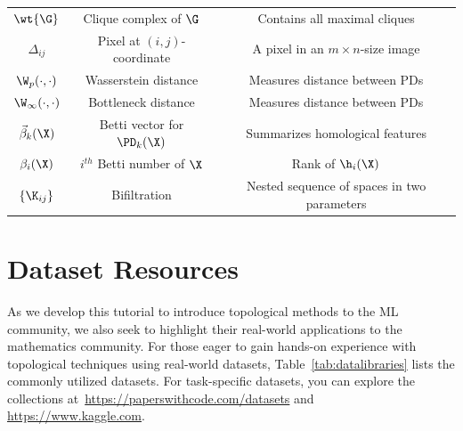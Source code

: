 \begin{table}[h!]
\begin{tabular}{ccc}
$\wt{\G}$ & Clique complex of $\G$ & Contains all maximal cliques \\
$\Delta_{ij}$ & Pixel at $(i,j)$-coordinate & A pixel in an $m\times n$-size image \\
$\W_p(\cdot, \cdot)$ & Wasserstein distance & Measures distance between PDs  \\
$\W_\infty(\cdot, \cdot)$ & Bottleneck distance & Measures distance between PDs \\
$\vec{\beta}_k(\X)$ & Betti vector for $\PD_k(\X)$ & Summarizes homological features \\
$\beta_i(\X)$ &  $i^{th}$ Betti number of $\X$ & Rank of $\h_i(\X)$ \\
$\{\K_{ij}\}$ & Bifiltration & Nested sequence of spaces in two parameters\\
\bottomrule
\end{tabular}
\end{table}


\section{Dataset Resources}

As we develop this tutorial to introduce topological methods to the ML community, we also seek to highlight their real-world applications to the mathematics community. For those eager to gain hands-on experience with topological techniques using real-world datasets, Table~\ref{tab:datalibraries} lists the commonly utilized datasets. For task-specific datasets, you can explore the collections at~\url{https://paperswithcode.com/datasets} and \url{https://www.kaggle.com}.



